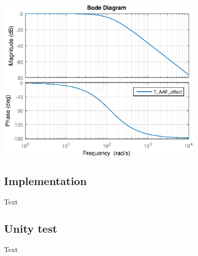 	\includegraphics [width=4in]{Hardware/Pictures/FilterAnalyse_02.eps}



\subsection{Implementation}
Text

\subsection{Unity test}
Text